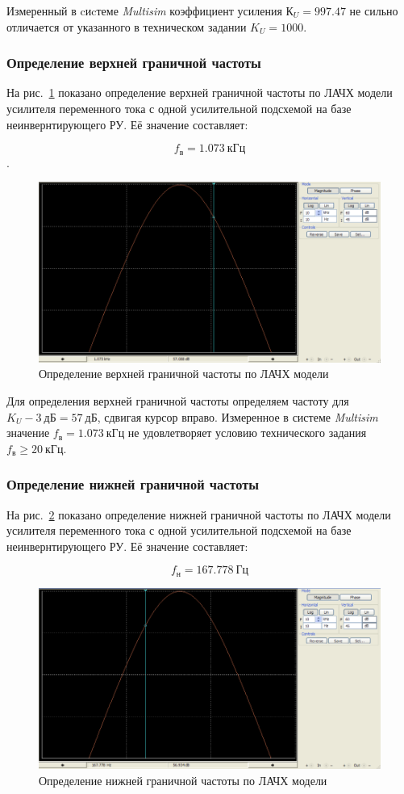 Измеренный в cиcтеме \textit{Multisim}
коэффициент усиления $ К_U = 997.47 $ 
не сильно отличается от указанного 
в техническом задании $ K_U = 1000 $.

\subsubsection*{Определение верхней граничной частоты}

На рис.~\ref{fig:plot_f_high_noninv_py} показано 
определение верхней граничной частоты 
по ЛАЧХ модели
усилителя переменного тока
с одной усилительной подсхемой
на базе неинвернтирующего РУ.
Её значение составляет:

$$ f_в = 1.073~кГц $$.

\begin{figure}[H]
	\centering
	\includegraphics[width=0.7\linewidth]{photo/plot_f_high_noninv_py}
	\caption{Определение верхней граничной частоты по ЛАЧХ модели}
	\label{fig:plot_f_high_noninv_py}
\end{figure}

Для определения верхней граничной частоты 
определяем частоту для $ K_U - 3~дБ = 57~дБ $, 
сдвигая курсор вправо. 
Измеренное в системе \textit{Multisim} значение 
$ f_в = 1.073~кГц $ не удовлетворяет условию 
технического задания $ f_в \ge 20~кГц $.

\subsubsection*{Определение нижней граничной частоты}

На рис.~\ref{fig:plot_f_low_noninv_py} показано 
определение нижней граничной частоты
по ЛАЧХ модели
усилителя переменного тока
с одной усилительной подсхемой
на базе неинвернтирующего РУ.
Её значение составляет:

$$ f_н = 167.778~Гц $$

\begin{figure}[H]
	\centering
	\includegraphics[width=0.7\linewidth]{photo/plot_f_low_noninv_py}
	\caption{Определение нижней граничной частоты по ЛАЧХ модели}
	\label{fig:plot_f_low_noninv_py}
\end{figure}

